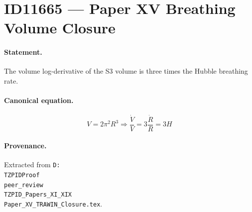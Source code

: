 \section*{ID11665 --- Paper XV Breathing Volume Closure}

\paragraph{Statement.}
The volume log-derivative of the S3 volume is three times the Hubble breathing rate.

\paragraph{Canonical equation.}
\[
V=2\pi^2R^3\Rightarrow\frac{\dot V}{V}=3\frac{\dot R}{R}=3H
\]

\paragraph{Provenance.}
Extracted from \texttt{D:\\TZPIDProof\\peer\_review\\TZPID\_Papers\_XI\_XIX\\Paper\_XV\_TRAWIN\_Closure.tex}.
